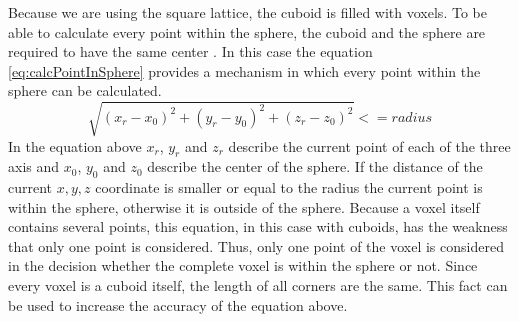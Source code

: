 Because we are using the square lattice, the cuboid is filled with voxels. To be able to calculate every point within the sphere, the cuboid and the sphere are required to have the same center \cite{REF}. In this case the equation \ref{eq:calcPointInSphere} provides a mechanism in which every point within the sphere can be calculated.
\begin{equation}\label{eq:calcPointInSphere}
\sqrt{(x_{r}-x_{0})^2 + (y_{r}-y_{0})^2 + (z_{r}-z_{0})^2} <= radius
\end{equation}
In the equation above $x_{r}$, $y_{r}$ and $z_{r}$ describe the current point of each of the three axis and $x_{0}$, $y_{0}$ and $z_{0}$ describe the center of the sphere. If the distance of the current $x, y, z$ coordinate is smaller or equal to the radius the current point is within the sphere, otherwise it is outside of the sphere.
Because a voxel itself contains several points, this equation, in this case with cuboids, has the weakness that only one point is considered. Thus, only one point of the voxel is considered in the decision whether the complete voxel is within the sphere or not. Since every voxel is a cuboid itself, the length of all corners are the same. This fact can be used to increase the accuracy  of the equation above.

